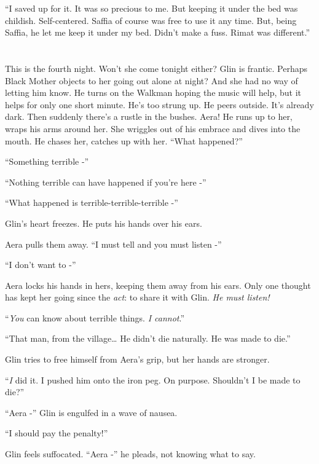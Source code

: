 \documentclass[twoside,11pt]{book}
\begin{document}
``I saved up for it. It was so precious to me. But keeping it under the bed was childish. Self-centered. Saffia of
course was free to use it any time. But, being Saffia, he let me keep it under my bed. Didn't make a fuss. Rimat was
different.''


\bigskip

\chapter{}

This is the fourth night. Won't she come tonight either? Glin is frantic. Perhaps Black Mother objects to her going out
alone at night? And she had no way of letting him know. He turns on the Walkman hoping the music will help, but it
helps for only one short minute. He's too strung up. He peers outside. It's already dark. Then suddenly there's a
rustle in the bushes. Aera! He runs up to her, wraps his arms around her. She wriggles out of his embrace and dives
into the mouth. He chases her, catches up with her. ``What happened?''

``Something terrible -''

``Nothing terrible can have happened if you're here -''

``What happened is terrible-terrible-terrible -''

Glin's heart freezes. He puts his hands over his ears.

Aera pulls them away. ``I must tell and you must listen -''

``I don't want to -''

Aera locks his hands in hers, keeping them away from his ears. Only one thought has kept her going since the
\textit{act}: to share it with Glin. \textit{He must listen! }

``\textit{You} can know about terrible things. \textit{I cannot}.''

``That man, from the village{\dots} He didn't die naturally. He was made to die.''

Glin tries to free himself from Aera's grip, but her hands are stronger.

``\textit{I} did it. I pushed him onto the iron peg. On purpose. Shouldn't I be made to die?''


``Aera -'' Glin is engulfed in a wave of nausea.

``I should pay the penalty!''

Glin feels suffocated. ``Aera -'' he pleads, not knowing what to say.
\end{document}
